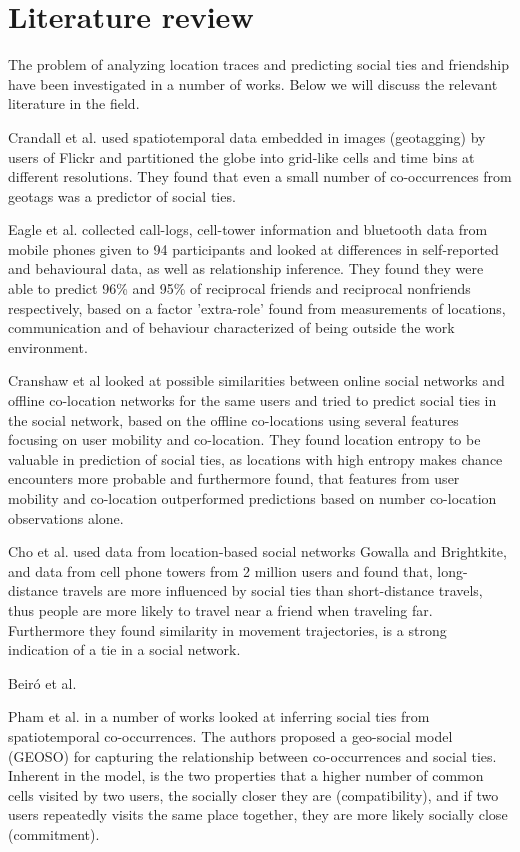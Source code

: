 \chapter{Literature review}
\label{chap:literature_review}
The problem of analyzing location traces and predicting social ties and friendship have been investigated in a number of works.
Below we will discuss the relevant literature in the field.

Crandall et al.\cite{crandall2010inferring} used spatiotemporal data embedded in images (geotagging) by users of Flickr and partitioned the globe into grid-like cells and time bins at different resolutions. They found that even a small number of co-occurrences from geotags was a predictor of social ties.

Eagle et al.\cite{eagle} collected call-logs, cell-tower information and bluetooth data from mobile phones given to 94 participants and looked at differences in self-reported and behavioural data, as well as relationship inference. They found they were able to predict 96\% and 95\% of reciprocal friends and reciprocal nonfriends respectively, based on a factor 'extra-role' found from measurements of locations, communication and of behaviour characterized of being outside the work environment.

Cranshaw et al\cite{cranshaw2010bridging} looked at possible similarities between online social networks and offline co-location networks for the same users and tried to predict social ties in the social network, based on the offline co-locations using several features focusing on user mobility and co-location. They found location entropy to be valuable in prediction of social ties, as locations with high entropy makes chance encounters more probable and furthermore found, that features from user mobility and co-location outperformed predictions based on number co-location observations alone.

Cho et al.\cite{FaMUMiLBSN} used data from location-based social networks Gowalla and Brightkite, and data from cell phone towers from 2 million users and found that, long-distance travels are more influenced by social ties than short-distance travels, thus people are more likely to travel near a friend when traveling far. Furthermore they found similarity in movement trajectories, is a strong indication of a tie in a social network.

Beiró et al. \cite{human_mob_through_assi}

Pham et al. in a number of works looked at inferring social ties from spatiotemporal co-occurrences\cite{pham2011towards}\cite{iRWRfSD}. The authors proposed a geo-social model (GEOSO) for capturing the relationship between co-occurrences and social ties. Inherent in the model, is the two properties that a higher number of common cells visited by two users, the socially closer they are (compatibility), and if two users repeatedly visits the same place together, they are more likely socially close (commitment).

